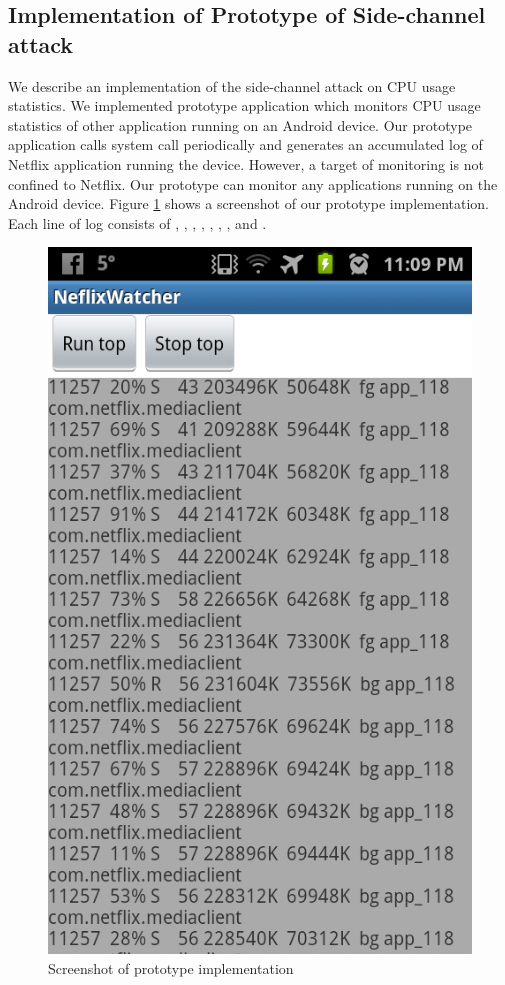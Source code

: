 \subsection{Implementation of Prototype of Side-channel attack}
\label{sec:implementation} 

We describe an implementation of the side-channel attack on CPU usage statistics. 
We implemented prototype application which monitors CPU usage statistics of other application running on an Android device.
Our prototype application calls  system call periodically and generates an accumulated log of Netflix application running the device. 
However, a target of monitoring is not confined to Netflix.
Our prototype can monitor any applications running on the Android device. 
Figure \ref{fig:prototype_screenshot} shows a screenshot of our prototype implementation. 
Each line of log consists of , , , , , , ,  and . 

\begin{figure}[!h]
\centering
\includegraphics[scale=0.20]{Figures/netflix_watcher_screenshot2}
\caption{Screenshot of prototype implementation}
\label{fig:prototype_screenshot}
\end{figure}

